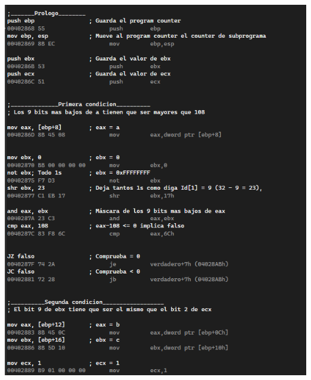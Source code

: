 \documentclass[11pt,a4paper]{article}
\begin{document}
\begin{center}
  \begin{minipage}{0.49\textwidth}
      \includegraphics[width=1.055\textwidth]{isValidAssembly1.png}
  \end{minipage}
  \begin{minipage}{0.49\textwidth}

\end{minipage}
\end{center}
\end{document}
